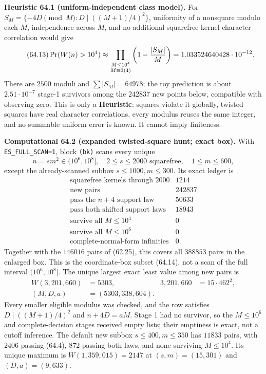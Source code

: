 \documentclass[10pt,reqno]{amsart}
\theoremstyle{definition}
\newcommand{\1}{\mathbf 1}
\begin{document}
\medskip\noindent\textbf{Heuristic 64.1 (uniform-independent class model).}
For $S_M=\{-4D\pmod M:D\mid((M+1)/4)^2\}$, uniformity of a nonsquare modulo
each $M$, independence across $M$, and no additional squarefree-kernel
character correlation would give
\begin{equation}\tag{64.13}
 \Pr(W(n)>10^4)\approx
 \prod_{\substack{M\leq10^4\\M\equiv3(4)}}
       \left(1-{|S_M|\over M}\right)
 =1.033524640428\cdot10^{-12}.
\end{equation}
There are $2500$ moduli and $\sum|S_M|=64978$; the toy prediction is about
$2.51\cdot10^{-7}$ stage-1 survivors among the $242837$ new points below,
compatible with observing zero.  This is only a \textbf{Heuristic}:
squares violate it globally, twisted squares have real character
correlations, every modulus reuses the same integer, and no summable uniform
error is known.  It cannot imply finiteness.

\medskip\noindent\textbf{Computational 64.2 (expanded twisted-square hunt;
exact box).}
With \texttt{ES\_FULL\_SCAN=1}, block \texttt{(bk)} scans every unique
\begin{equation}\tag{64.14}
 n=sm^2\in(10^6,10^8],\quad2\leq s\leq2000\text{ squarefree},
 \quad1\leq m\leq600,
\end{equation}
except the already-scanned subbox $s\leq1000,m\leq300$.  Its exact ledger is
\begin{equation}\tag{64.15}
\begin{array}{l|r}
\text{squarefree kernels through 2000}&1214\\
\text{new pairs}&242837\\
\text{pass the }n+4\text{ support law}&50633\\
\text{pass both shifted support laws}&18943\\
\text{survive all }M\leq10^4&0\\
\text{survive all }M\leq10^6&0\\
\text{complete-normal-form infinities}&0.
\end{array}
\end{equation}
Together with the $146016$ pairs of (62.25), this covers all $388853$ pairs
in the enlarged box.  This is the coordinate-box subset (64.14), not a scan
of the full interval $(10^6,10^8]$.  The unique largest exact least value
among new pairs is
\begin{equation}\tag{64.16}
 \begin{aligned}
 W(3{,}201{,}660)&=5303,&3{,}201{,}660&=15\cdot462^2,\\
 (M,D,a)&=(5303,338,604).&&
 \end{aligned}
\end{equation}
Every smaller eligible modulus was checked, and the row satisfies
$D\mid((M+1)/4)^2$ and $n+4D=aM$.  Stage 1 had no survivor, so the
$M\leq10^6$ and complete-decision stages received empty lists; their
emptiness is exact, not a cutoff inference.  The default new subbox
$s\leq400,m\leq350$ has $11833$ pairs, with $2406$ passing (64.4), $872$
passing both laws, and none surviving $M\leq10^4$.  Its unique maximum is
$W(1{,}359{,}015)=2147$ at $(s,m)=(15,301)$ and $(D,a)=(9,633)$.
\end{document}
